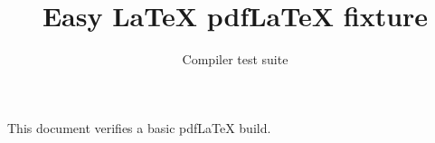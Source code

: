 \documentclass{article}
\title{Easy LaTeX pdfLaTeX fixture}
\author{Compiler test suite}
\begin{document}
\maketitle
This document verifies a basic pdfLaTeX build.
\end{document}

